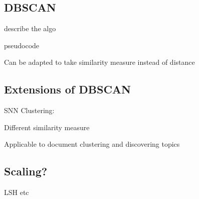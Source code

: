 \subsection{DBSCAN} \label{sec:dbscan}

describe the algo \cite{ester1996density}


pseudocode

Can be adapted to take similarity measure instead of distance


\subsection{Extensions of DBSCAN} \label{sec:dbscan-ext}

SNN Clustering: \cite{ertoz2003finding}

Different similarity measure

Applicable to document clustering and discovering topics \cite{ertoz2004finding}



\subsection{Scaling?}

LSH etc
